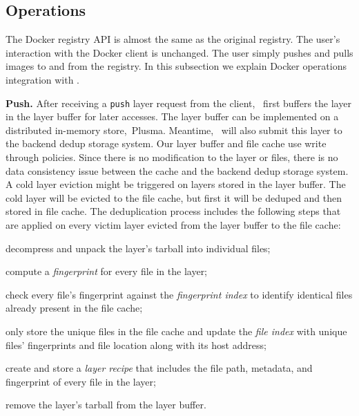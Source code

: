 \subsection{Operations}
\label{sec:design_operations}

%
The Docker registry API is almost the same as the original registry.
The user's interaction with the Docker client is unchanged. The user simply pushes and pulls images to and from the registry. In this subsection we explain Docker operations integration with \sysname.


\textbf{Push.}
After receiving a \texttt{push} layer request from the client, 
\sysname~first buffers the layer in the layer buffer for later accesses. 
The layer buffer can be implemented on a distributed in-memory store,~\eg Plusma.
Meantime, \sysname~will also submit this layer to the backend dedup storage system.
Our layer buffer and file cache use write through policies. 
Since there is no modification to the layer or files, there is no data consistency issue between the cache and the backend dedup storage system.
A cold layer eviction might be triggered on layers stored in the layer buffer.
The cold layer will be evicted to the file cache, but first it will be deduped and then stored in file cache.
The deduplication process includes the following steps that are applied on every victim layer evicted from the layer buffer to the file cache:

\begin{compactenumerate}
	\item decompress and unpack the layer's tarball into individual files;
	\item compute a \emph{fingerprint} for every file in the layer;
	\item check every file's fingerprint against the \emph{fingerprint index} to
	identify identical files already present in the file cache;
	\item only store the unique files in the file cache and update the 
	\emph{file index} with unique files' fingerprints and file location along with its host address;
	\item create and store a \emph{layer recipe} that includes the file path,
	metadata, and fingerprint of every file in the layer;
	\item remove the layer's tarball from the layer buffer.
\end{compactenumerate}

